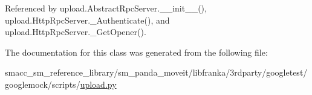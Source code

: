 Referenced by upload.\+Abstract\+Rpc\+Server.\+\_\+\+\_\+init\+\_\+\+\_\+(), upload.\+Http\+Rpc\+Server.\+\_\+\+Authenticate(), and upload.\+Http\+Rpc\+Server.\+\_\+\+Get\+Opener().



The documentation for this class was generated from the following file\+:\begin{DoxyCompactItemize}
\item 
smacc\+\_\+sm\+\_\+reference\+\_\+library/sm\+\_\+panda\+\_\+moveit/libfranka/3rdparty/googletest/googlemock/scripts/\hyperlink{googlemock_2scripts_2upload_8py}{upload.\+py}\end{DoxyCompactItemize}
